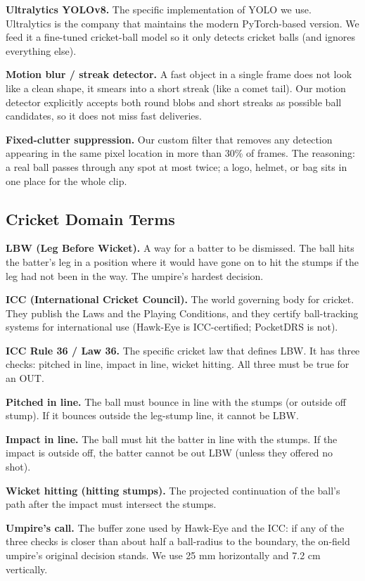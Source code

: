 \documentclass[11pt,a4paper]{article}
\begin{document}
\textbf{Ultralytics YOLOv8.} The specific implementation of YOLO we use. Ultralytics is the company that maintains the modern PyTorch-based version. We feed it a fine-tuned cricket-ball model so it only detects cricket balls (and ignores everything else).

\textbf{Motion blur / streak detector.} A fast object in a single frame does not look like a clean shape, it smears into a short streak (like a comet tail). Our motion detector explicitly accepts both round blobs and short streaks as possible ball candidates, so it does not miss fast deliveries.

\textbf{Fixed-clutter suppression.} Our custom filter that removes any detection appearing in the same pixel location in more than 30\% of frames. The reasoning: a real ball passes through any spot at most twice; a logo, helmet, or bag sits in one place for the whole clip.

\subsection{Cricket Domain Terms}

\textbf{LBW (Leg Before Wicket).} A way for a batter to be dismissed. The ball hits the batter's leg in a position where it would have gone on to hit the stumps if the leg had not been in the way. The umpire's hardest decision.

\textbf{ICC (International Cricket Council).} The world governing body for cricket. They publish the Laws and the Playing Conditions, and they certify ball-tracking systems for international use (Hawk-Eye is ICC-certified; PocketDRS is not).

\textbf{ICC Rule 36 / Law 36.} The specific cricket law that defines LBW. It has three checks: pitched in line, impact in line, wicket hitting. All three must be true for an OUT.

\textbf{Pitched in line.} The ball must bounce in line with the stumps (or outside off stump). If it bounces outside the leg-stump line, it cannot be LBW.

\textbf{Impact in line.} The ball must hit the batter in line with the stumps. If the impact is outside off, the batter cannot be out LBW (unless they offered no shot).

\textbf{Wicket hitting (hitting stumps).} The projected continuation of the ball's path after the impact must intersect the stumps.

\textbf{Umpire's call.} The buffer zone used by Hawk-Eye and the ICC: if any of the three checks is closer than about half a ball-radius to the boundary, the on-field umpire's original decision stands. We use 25 mm horizontally and 7.2 cm vertically.
\end{document}
